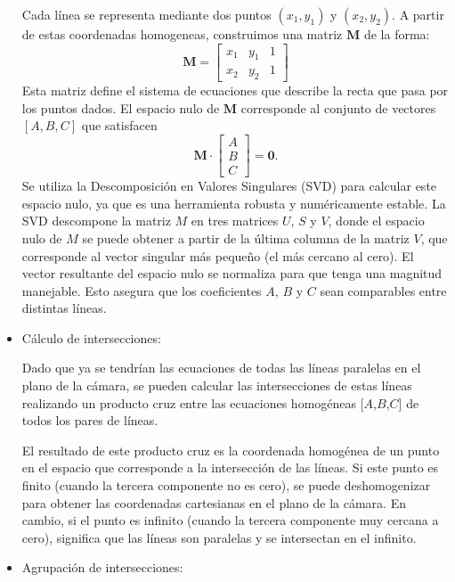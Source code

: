 \begin{itemize}
    Cada línea se representa mediante dos puntos $(x_1, y_1)$ y $(x_2, y_2)$. A partir de estas coordenadas homogeneas, construimos una matriz $\mathbf{M}$ de la forma:
    \[
        \mathbf{M} = \begin{bmatrix}
                         x_1 & y_1 & 1 \\
                         x_2 & y_2 & 1
        \end{bmatrix}
    \]
    Esta matriz define el sistema de ecuaciones que describe la recta que pasa por los puntos dados.
    El espacio nulo de $\mathbf{M}$ corresponde al conjunto de vectores $[A,B,C]$ que satisfacen
    \[
        \mathbf{M} \cdot \begin{bmatrix}
                             A \\ B \\ C
        \end{bmatrix} = \mathbf{0}.
    \]
    Se utiliza la Descomposición en Valores Singulares (SVD) para calcular este espacio nulo, ya que es una herramienta robusta y numéricamente estable.
    La SVD descompone la matriz \(M\) en tres matrices \(U\), \(S\) y \(V\), donde el espacio nulo de \(M\) se puede obtener a partir de la última columna de la matriz \(V\), que corresponde al vector singular más pequeño (el más cercano al cero).
    El vector resultante del espacio nulo se normaliza para que tenga una magnitud manejable.
    Esto asegura que los coeficientes \(A\), \(B\) y \(C\) sean comparables entre distintas líneas.

    \item Cálculo de intersecciones:

    Dado que ya se tendrían las ecuaciones de todas las líneas paralelas en el plano de la cámara, se pueden calcular las intersecciones de estas líneas realizando un producto cruz entre las ecuaciones homogéneas [\(A\),\(B\),\(C\)] de todos los pares de líneas.

    El resultado de este producto cruz es la coordenada homogénea de un punto en el espacio que corresponde a la intersección de las líneas.
    Si este punto es finito (cuando la tercera componente no es cero), se puede deshomogenizar para obtener las coordenadas cartesianas en el plano de la cámara.
    En cambio, si el punto es infinito (cuando la tercera componente muy cercana a cero), significa que las líneas son paralelas y se intersectan en el infinito.


    \item  Agrupación de intersecciones:


\end{itemize}
